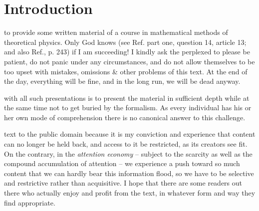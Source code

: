\chapter*{Introduction}






to provide some written material of a course in mathematical methods of theoretical physics.
Only God knows (see Ref.\cite{Aquinas} part one, question 14, article 13; and  also Ref.\cite{specker-60}, p. 243)
if I am  succeeding!
I kindly ask the perplexed to please be patient, do not panic under any circumstances,
and do not allow themselves to be too upset with mistakes, omissions \& other problems of this text.
At the end of the day, everything will be fine, and in the long run, we will be dead anyway.

with all such presentations is to present the material in sufficient depth while at the same time not to get buried by the formalism.
As every individual has his or her own mode of comprehension there is no canonical answer to this challenge.

 text to the public domain because it is my conviction and experience that content can no longer be held back,
 and access to it be restricted, as its creators see fit.
On the contrary, in the {\em attention economy} -- subject to the scarcity as well as the compound accumulation of attention --
we experience a push toward so much content that we can hardly bear this information flood, so we have to be selective
and restrictive rather than acquisitive.
I hope that there are some readers out there who actually enjoy and profit from the text, in whatever form and way they find appropriate.

